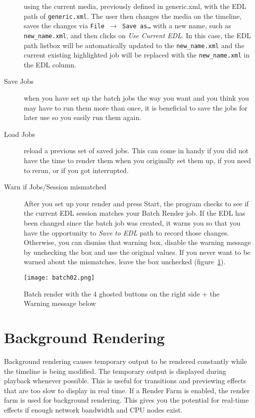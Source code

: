 \begin{description}
    using the current media, previously defined in generic.xml, with the EDL path of \texttt{generic.xml}.  The
    user then changes the media on the timeline, saves the changes via \texttt{File $\rightarrow$ Save as\dots} with a new 
    name, such as \texttt{new\_name.xml}, and then clicks on \textit{Use Current EDL}.  In this case, the EDL path
    listbox will be automatically updated to the \texttt{new\_name.xml} and the current existing highlighted job will be replaced with the \texttt{new\_name.xml} in the EDL column.
    \item[Save Jobs] when you have set up the batch jobs the way you want and you think you may have to
    run them more than once, it is beneficial to save the jobs for later use so you easily run them again.
    \item[Load Jobs] reload a previous set of saved jobs.  This can come in handy if you did not have the
    time to render them when you originally set them up, if you need to rerun, or if you got interrupted.
    \item[Warn if Jobs/Session mismatched] After you set up your render and press Start, the program checks to see if the current EDL session matches your Batch Render job.  If the EDL has
    been changed since the batch job was created, it warns you so that you have the opportunity to \textit{Save to EDL} path to record those changes.  Otherwise, you can dismiss that warning box, disable the warning message by unchecking the box and use the original values.  If you never want to be warned about the mismatches, leave the box unchecked (figure~\ref{fig:batch02}).
\end{description}

\begin{figure}[htpb]
    \centering
    \texttt{[image: batch02.png]}
    \caption{Batch render with the 4 ghosted buttons on the right side + the Warning message below}
    \label{fig:batch02}
\end{figure}

\section{Background Rendering}%
\label{sec:background_rendering}

Background rendering causes temporary output to be rendered constantly while the timeline is being modified. The temporary output is displayed during playback whenever possible. This is useful for transitions and previewing effects that are too slow to display in real time. If a Render Farm is enabled, the render farm is used for background rendering. This gives you the potential for real-time effects if enough network bandwidth and CPU nodes exist.

